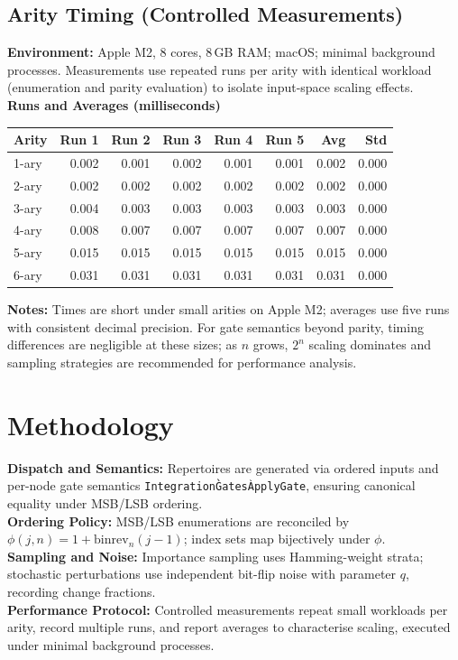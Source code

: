 \documentclass{article}
\begin{document}
\subsection*{Arity Timing (Controlled Measurements)}
\textbf{Environment:} Apple M2, 8 cores, 8\,GB RAM; macOS; minimal background processes. Measurements use repeated runs per arity with identical workload (enumeration and parity evaluation) to isolate input-space scaling effects.\\
\textbf{Runs and Averages (milliseconds)}
\begin{center}
\begin{tabular}{lrrrrr rr}
\toprule
Arity & Run 1 & Run 2 & Run 3 & Run 4 & Run 5 & Avg & Std \\
\midrule
1-ary & 0.002 & 0.001 & 0.002 & 0.001 & 0.001 & 0.002 & 0.000 \\
2-ary & 0.002 & 0.002 & 0.002 & 0.002 & 0.002 & 0.002 & 0.000 \\
3-ary & 0.004 & 0.003 & 0.003 & 0.003 & 0.003 & 0.003 & 0.000 \\
4-ary & 0.008 & 0.007 & 0.007 & 0.007 & 0.007 & 0.007 & 0.000 \\
5-ary & 0.015 & 0.015 & 0.015 & 0.015 & 0.015 & 0.015 & 0.000 \\
6-ary & 0.031 & 0.031 & 0.031 & 0.031 & 0.031 & 0.031 & 0.000 \\
\bottomrule
\end{tabular}
\end{center}
\textbf{Notes:} Times are short under small arities on Apple M2; averages use five runs with consistent decimal precision. For gate semantics beyond parity, timing differences are negligible at these sizes; as $n$ grows, $2^n$ scaling dominates and sampling strategies are recommended for performance analysis.



\section{Methodology}
\textbf{Dispatch and Semantics:} Repertoires are generated via ordered inputs and per-node gate semantics \texttt{Integration\`Gates\`ApplyGate}, ensuring canonical equality under MSB/LSB ordering.\\
\textbf{Ordering Policy:} MSB/LSB enumerations are reconciled by $\phi(j,n)=1+\mathrm{binrev}_n(j-1)$; index sets map bijectively under $\phi$.\\
\textbf{Sampling and Noise:} Importance sampling uses Hamming-weight strata; stochastic perturbations use independent bit-flip noise with parameter $q$, recording change fractions.\\
\textbf{Performance Protocol:} Controlled measurements repeat small workloads per arity, record multiple runs, and report averages to characterise scaling, executed under minimal background processes.
\end{document}
